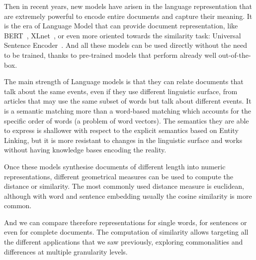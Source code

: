 Then in recent years, new models have arisen in the language representation that are extremely powerful to encode entire documents and capture their meaning. It is the
era of
Language Model that can provide document representation, like BERT~\cite{devlin2018bert}, XLnet~\cite{yang2019xlnet}, or even more oriented towards the similarity task: Universal Sentence Encoder~\cite{cer2018universal}.
And all these models can be used directly without the need to be trained, thanks to pre-trained models that perform already well out-of-the-box.

The main strength of Language models is that they can
relate documents that talk about the same events, even if they use different linguistic surface, from articles that may use the same subset of words but talk about different events.
It is a semantic matching more than a word-based matching which accounts for the specific order of words (a problem of word vectors). 
The semantics they are able to express
is shallower with respect to the explicit semantics based on Entity Linking, but it is more resistant to changes in the linguistic surface and works without having knowledge bases encoding the reality.










Once these models synthesise documents of different length into numeric representations, different geometrical measures can be used to compute the distance or similarity.
The most commonly used distance measure is euclidean, although with word and sentence embedding usually the cosine similarity is more common.

And we can compare therefore representations for single words, for sentences or even for complete documents.
The computation of similarity allows targeting all the different applications that we saw previously, exploring commonalities and differences at multiple granularity levels.


